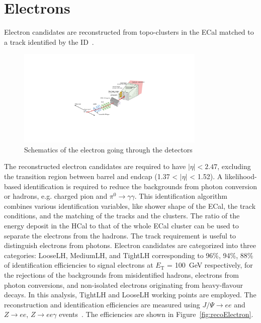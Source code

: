 \section{Electrons}
Electron candidates are reconstructed from topo-clusters in the ECal matched to a track identified by the ID~\cite{ATL-PHYS-PUB-2017-022}.
\begin{figure}[tbp]
\begin{center}
 \includegraphics[width=0.80\textwidth,keepaspectratio]{figures/Reconstruction/electronPath}
\caption{
Schematics of the electron going through the detectors
}
\label{fig:electronPath}
\end{center}
\end{figure}
The reconstructed electron candidates are required to have $|\eta|<2.47$, excluding the transition region between barrel and endcap (1.37 < $|\eta|$ < 1.52).
A likelihood-based identification is required to reduce the backgrounds from photon conversion or hadrons, e.g. charged pion and $\pi^0 \rightarrow \gamma \gamma$. 
This identification algorithm combines various identification variables, like shower shape of the ECal, the track conditions, and the matching of the tracks and the clusters. 
The ratio of the energy deposit in the HCal to that of the whole ECal cluster can be used to separate the electrons from the hadrons. 
The track requirement is useful to distinguish electrons from photons.
Electron candidates are categorized into three categories: LooseLH, MediumLH, and TightLH corresponding to 96\%, 94\%, 88\% of identification efficiencies to signal electrons at $E_\mathrm{T}$ = 100~GeV respectively, for the rejections of the backgrounds from misidentified hadrons, electrons from photon conversions, and non-isolated electrons originating from heavy-flavour decays. 
In this analysis, TightLH and LooseLH working points are employed.
The reconstruction and identification efficiencies are measured using  $J/\Psi \rightarrow ee$ and $Z\rightarrow ee$, $Z\rightarrow ee\gamma$ events~\cite{PERF-2017-01}. The efficiencies are shown in Figure~\ref{fig:recoElectron}. 
